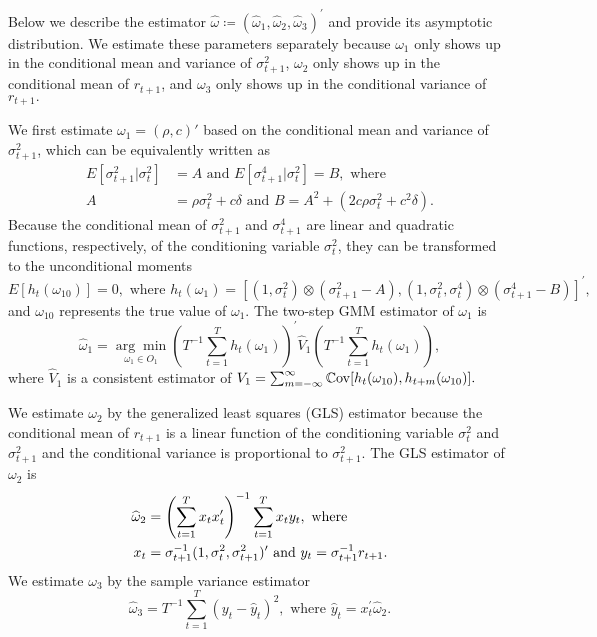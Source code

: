 Below we describe the estimator $\widehat{\omega } \coloneqq (\widehat{\omega }_{1}, \widehat{\omega }_{2},\widehat{\omega }_{3})^{\prime }$ and provide its asymptotic distribution. We estimate these parameters separately because $\omega _{1}$ only shows up in the conditional mean and variance of $\sigma _{t+1}^{2}$, $\omega_{2}$ only shows up in the conditional mean of $r_{t+1}$, and $\omega _{3}$ only shows up in the conditional variance of $
r_{t+1}.$

We first estimate $\omega _{1}=(\rho,c)'$ based on the conditional mean and variance of $\sigma _{t+1}^{2}$, which can be equivalently written as 
%
\begin{align}
    E[\sigma _{t+1}^{2}|\sigma _{t}^{2}] &= A\text{ and }E[\sigma _{t+1}^{4}|\sigma _{t}^{2}]=B,\text{ where }  \nonumber \\
%
    A &= \rho \sigma _{t}^{2}+c\delta \text{ and }B=A^{2}+\left( 2c\rho \sigma _{t}^{2}+c^{2}\delta \right) .
\end{align}
%
Because the conditional mean of $\sigma _{t+1}^{2}$ and $\sigma _{t+1}^{4}$ are linear and quadratic functions, respectively, of the conditioning variable $\sigma _{t}^{2}$, they can be transformed to the unconditional moments
%
\begin{equation}
    E[h_{t}(\omega _{10})]=0,\text{ where }h_{t}(\omega _{1})=[(1,\sigma _{t}^{2})\otimes (\sigma _{t+1}^{2}-A),(1,\sigma _{t}^{2},\sigma _{t}^{4})\otimes (\sigma _{t+1}^{4}-B)]^{\prime },
\end{equation}
%
and $\omega _{10}$ represents the true value of $\omega _{1}$. The two-step GMM estimator of $\omega _{1}$ is%
%
\begin{equation}
    \label{omega 1 est}
    \widehat{\omega }_{1}=\underset{\omega _{1}\in O_{1}}{\arg \min }\left( T^{-1}\sum_{t=1}^{T}h_{t}(\omega _{1})\right) ^{\prime }\widehat{V}_{1}\left( T^{-1}\sum_{t=1}^{T}h_{t}(\omega _{1})\right) ,
\end{equation}%
%
where $\widehat{V}_{1}$ is a consistent estimator of $V_{1}=\sum_{m=-\infty }^{\infty }\operatorname{\mathbb{C}ov}[h_{t}(\omega _{10}),h_{t+m}(\omega _{10})].$

We estimate $\omega _{2}$ by the generalized least squares (GLS) estimator because the conditional mean of $r_{t+1}$ is a linear function of the conditioning variable $\sigma _{t}^{2}$ and $\sigma _{t+1}^{2}$ and the conditional variance is proportional to $\sigma _{t+1}^{2}.$ The GLS estimator of $\omega _{2}$ is
%
\begin{align}
    \widehat{\omega }_{2} &= \left( \sum_{t=1}^{T}x_{t}x_{t}^{\prime }\right) ^{-1}\sum_{t=1}^{T}x_{t}y_{t},\text{ where }  \notag \\ 
%
    x_{t} &= \sigma _{t+1}^{-1}(1,\sigma _{t}^{2},\sigma _{t+1}^{2})^{\prime } \text{ and }y_{t}=\sigma _{t+1}^{-1}r_{t+1}.  \label{omega 2 est}
\end{align}
%
We estimate $\omega _{3}$ by the sample variance estimator
%
\begin{equation}
    \label{omega 3 est}
    \widehat{\omega }_{3}=T^{-1}\sum_{t=1}^{T}\left( y_{t}-\widehat{y}_{t}\right) ^{2},\text{ where }\widehat{y}_{t}=x_{t}^{\prime }\widehat{ \omega }_{2}.  
\end{equation}

